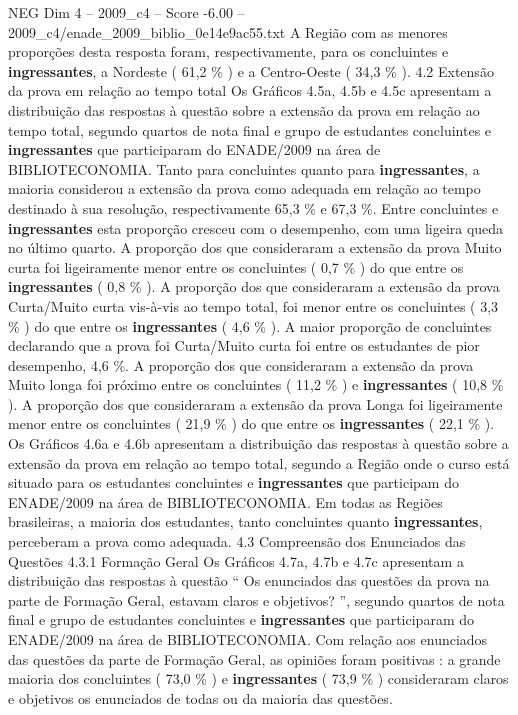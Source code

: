 \begin{textsample}{NEG Dim 4 – 2009\_c4 – Score -6.00 – 2009\_c4/enade\_2009\_biblio\_0e14e9ac55.txt}
A Região com as menores proporções desta resposta foram, respectivamente, para os concluintes e \textbf{ingressantes}, a Nordeste ( 61,2 \% ) e a Centro-Oeste ( 34,3 \% ). 4.2 Extensão da prova em relação ao tempo total Os Gráficos 4.5a, 4.5b e 4.5c apresentam a distribuição das respostas à questão sobre a extensão da prova em relação ao tempo total, segundo quartos de nota final e grupo de estudantes concluintes e \textbf{ingressantes} que participaram do ENADE/2009 na área de BIBLIOTECONOMIA.
Tanto para concluintes quanto para \textbf{ingressantes}, a maioria considerou a extensão da prova como adequada em relação ao tempo destinado à sua resolução, respectivamente 65,3 \% e 67,3 \%.
Entre concluintes e \textbf{ingressantes} esta proporção cresceu com o desempenho, com uma ligeira queda no último quarto.
A proporção dos que consideraram a extensão da prova Muito curta foi ligeiramente menor entre os concluintes ( 0,7 \% ) do que entre os \textbf{ingressantes} ( 0,8 \% ).
A proporção dos que consideraram a extensão da prova Curta/Muito curta vis-à-vis ao tempo total, foi menor entre os concluintes ( 3,3 \% ) do que entre os \textbf{ingressantes} ( 4,6 \% ).
A maior proporção de concluintes declarando que a prova foi Curta/Muito curta foi entre os estudantes de pior desempenho, 4,6 \%.
A proporção dos que consideraram a extensão da prova Muito longa foi próximo entre os concluintes ( 11,2 \% ) e \textbf{ingressantes} ( 10,8 \% ).
A proporção dos que consideraram a extensão da prova Longa foi ligeiramente menor entre os concluintes ( 21,9 \% ) do que entre os \textbf{ingressantes} ( 22,1 \% ).
Os Gráficos 4.6a e 4.6b apresentam a distribuição das respostas à questão sobre a extensão da prova em relação ao tempo total, segundo a Região onde o curso está situado para os estudantes concluintes e \textbf{ingressantes} que participam do ENADE/2009 na área de BIBLIOTECONOMIA.
Em todas as Regiões brasileiras, a maioria dos estudantes, tanto concluintes quanto \textbf{ingressantes}, perceberam a prova como adequada. 4.3 Compreensão dos Enunciados das Questões 4.3.1 Formação Geral Os Gráficos 4.7a, 4.7b e 4.7c apresentam a distribuição das respostas à questão “ Os enunciados das questões da prova na parte de Formação Geral, estavam claros e objetivos? ”, segundo quartos de nota final e grupo de estudantes concluintes e \textbf{ingressantes} que participaram do ENADE/2009 na área de BIBLIOTECONOMIA.
Com relação aos enunciados das questões da parte de Formação Geral, as opiniões foram positivas : a grande maioria dos concluintes ( 73,0 \% ) e \textbf{ingressantes} ( 73,9 \% ) consideraram claros e objetivos os enunciados de todas ou da maioria das questões.

\end{textsample}
